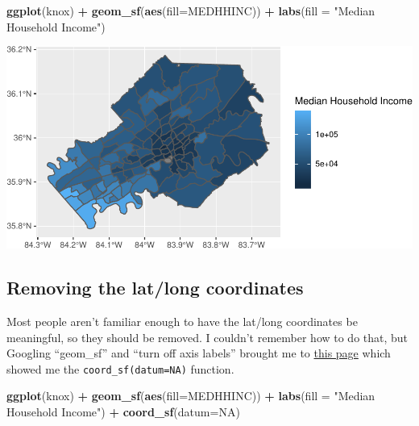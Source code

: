 \documentclass[]{article}
\newenvironment{Shaded}{\begin{snugshade}}{\end{snugshade}}
\newcommand{\DataTypeTok}[1]{\textcolor[rgb]{0.13,0.29,0.53}{#1}}
\newcommand{\KeywordTok}[1]{\textcolor[rgb]{0.13,0.29,0.53}{\textbf{#1}}}
\newcommand{\NormalTok}[1]{#1}
\newcommand{\OperatorTok}[1]{\textcolor[rgb]{0.81,0.36,0.00}{\textbf{#1}}}
\newcommand{\OtherTok}[1]{\textcolor[rgb]{0.56,0.35,0.01}{#1}}
\newcommand{\StringTok}[1]{\textcolor[rgb]{0.31,0.60,0.02}{#1}}
\begin{document}
\begin{Shaded}
\begin{Highlighting}[]
\KeywordTok{ggplot}\NormalTok{(knox) }\OperatorTok{+}\StringTok{ }
\StringTok{  }\KeywordTok{geom_sf}\NormalTok{(}\KeywordTok{aes}\NormalTok{(}\DataTypeTok{fill=}\NormalTok{MEDHHINC)) }\OperatorTok{+}\StringTok{ }
\StringTok{  }\KeywordTok{labs}\NormalTok{(}\DataTypeTok{fill =} \StringTok{"Median Household Income"}\NormalTok{) }
\end{Highlighting}
\end{Shaded}

\includegraphics{lab02_rmarkdown_tutorial_files/figure-latex/unnamed-chunk-3-1.pdf}

\hypertarget{removing-the-latlong-coordinates}{%
\subsection{Removing the lat/long
coordinates}\label{removing-the-latlong-coordinates}}

Most people aren't familiar enough to have the lat/long coordinates be
meaningful, so they should be removed. I couldn't remember how to do
that, but Googling ``geom\_sf'' and ``turn off axis labels'' brought me
to
\href{https://stackoverflow.com/questions/49836184/cant-remove-gridlines-when-plotting-with-geom-sf}{this
page} which showed me the \texttt{coord\_sf(datum=NA)} function.

\begin{Shaded}
\begin{Highlighting}[]
\KeywordTok{ggplot}\NormalTok{(knox) }\OperatorTok{+}\StringTok{ }
\StringTok{  }\KeywordTok{geom_sf}\NormalTok{(}\KeywordTok{aes}\NormalTok{(}\DataTypeTok{fill=}\NormalTok{MEDHHINC)) }\OperatorTok{+}\StringTok{ }
\StringTok{  }\KeywordTok{labs}\NormalTok{(}\DataTypeTok{fill =} \StringTok{"Median Household Income"}\NormalTok{) }\OperatorTok{+}
\StringTok{  }\KeywordTok{coord_sf}\NormalTok{(}\DataTypeTok{datum=}\OtherTok{NA}\NormalTok{)}
\end{Highlighting}
\end{Shaded}
\end{document}
